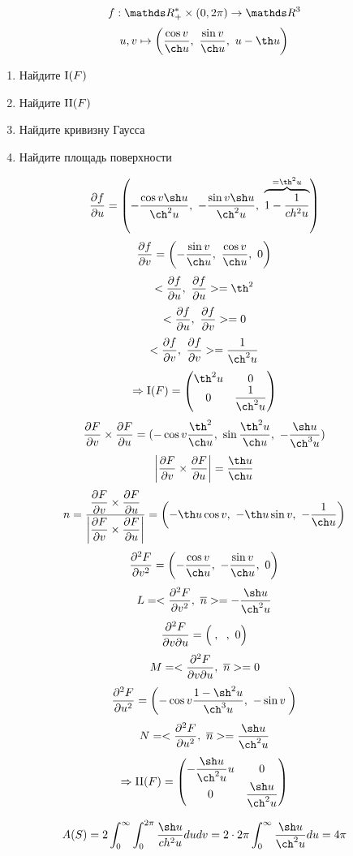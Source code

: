 \documentclass[main]{subfiles}
\begin{document}

    \begin{Example}
      \[f: \R_+^* \times (0, 2\pi) \ra \R^3\]
      \[u,v \mapsto \Br{\dfrac{\cos v}{\ch u},\ \dfrac{\sin v}{\ch u},\ u - \th u}\]
      \begin{enumerate}
        \item Найдите $\RNumb{1}(F)$
        \item Найдите $\RNumb{2}(F)$
        \item Найдите кривизну Гаусса
        \item Найдите площадь поверхности
      \end{enumerate}
    \end{Example}

    \begin{Sol}
      \[\dfrac{\d f}{\d u} = \Br{-\dfrac{\cos v \sh u}{\ch^2 u},\ -\dfrac{\sin v \sh u}{\ch^2 u},\ \ob{= \th^2 u}{1 - \dfrac{1}{ch^2 u}}}\]
      \[\dfrac{\d f}{\d v} = \Br{-\dfrac{\sin v}{\ch u},\ \dfrac{\cos v}{\ch u},\ 0}\]
      \[<\dfrac{\d f}{\d u},\ \dfrac{\d f}{\d u}> = \th^2\]
      \[<\dfrac{\partial f}{\partial u},\ \dfrac{\partial f}{\partial v}> = 0\]
      \[<\dfrac{\d f}{\d v},\ \dfrac{\d f}{\d v}> = \dfrac{1}{\ch^2 u}\]
      \[\Ra \RNumb{1}(F) = \begin{pmatrix}
        {}\th^2 u & 0\\
        0 & \dfrac{1}{\ch^2 u}
      \end{pmatrix}\]
      \[\frac{\d F}{\d v} \times \frac{\d F}{\d u} =
      (
        -\cos v \dfrac{\th^2}{\ch u},\
        \sin \dfrac{\th^2 u}{\ch u},\
        -\dfrac{\sh u}{\ch^3 u}
      )\]
      \[\abs{\dfrac{\d F}{\d v} \times \dfrac{\d F}{\d u}} = \dfrac{\th u}{\ch u}\]
      \[n =
      \dfrac{
        \dfrac{\d F}{\d v} \times \dfrac{\d F}{\d u}
      }{
        \abs{\dfrac{\d F}{\d v} \times \dfrac{\d F}{\d u}}
      } = \Br{- \th u \cos v,\ -\th u \sin v,\ -\dfrac{1}{\ch u}}\]
      \[\frac{\d^2 F}{\d v^2} = \Br{-\dfrac{\cos v}{\ch u},\ -\dfrac{\sin v}{\ch u},\ 0}\]
      \[L = <\frac{\d^2 F}{\d v^2},\ \ol{n}> = -\dfrac{\sh u}{\ch^2 u}\]
      \[\frac{\partial^2 F}{\partial v \partial u} = \left(\dfrac{}{},\ \dfrac{}{},\ 0\right)\]
      \[M = <\frac{\partial^2 F}{\partial v \partial u},\ \overline{n}> = 0\]
      \[\frac{\d^2 F}{\d u^2} = \Br{-\cos v \dfrac{1-\sh^2 u}{\ch^3 u},\ -\sin v \dfrac{}{}}\]
      \[N = <\frac{\d^2 F}{\d u^2},\ \ol{n}> = \dfrac{\sh u}{\ch^2 u}\]
      \[\Ra \RNumb{2}(F) = \begin{pmatrix}
        -\dfrac{\sh u}{\ch^2 u} u & 0\\
        0 & \dfrac{\sh u}{\ch^2 u}
      \end{pmatrix}\]

      \begin{figure}[H]
          \centering
      \end{figure}

      \[A(S) = 2 \int_0^{\infty} \int_0^{2\pi} \dfrac{\sh u}{ch^2 u} du dv = 2 \cdot 2\pi \int_0^{\infty} \dfrac{\sh u}{\ch^2 u} du = 4\pi\]
    \end{Sol}
\end{document}
